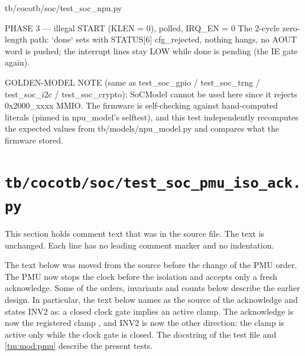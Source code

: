 \begin{relocated}{tb/cocotb/soc/test_soc_npu.py}
\begin{textblock}
PHASE 3 — illegal START (KLEN = 0), polled, IRQ_EN = 0
The 2-cycle zero-length path: `done` sets with STATUS[6] cfg_rejected, nothing hangs, no AOUT
word is pushed; the interrupt lines stay LOW while done is pending (the IE gate again).

GOLDEN-MODEL NOTE (same as test_soc_gpio / test_soc_trng / test_soc_i2c / test_soc_crypto): SoCModel
cannot be used here since it rejects 0x2000_xxxx MMIO. The firmware is self-checking against
hand-computed literals (pinned in npu_model's selftest), and this test independently recomputes the
expected values from tb/models/npu_model.py and compares what the firmware stored.
\end{textblock}

\end{relocated}

\section{\texttt{tb/cocotb/soc/test\_soc\_pmu\_iso\_ack.py}}\label{tm:suite:soc-test-soc-pmu-iso-ack}

This section holds comment text that was in the source file. The text is unchanged. Each line has no leading comment marker and no indentation.

\begin{information}
The text below was moved from the source before the change of the PMU order. The PMU now stops the clock before the isolation and accepts only a fresh acknowledge. Some of the orders, invariants and counts below describe the earlier design. In particular, the text below names  as the source of the acknowledge and states INV2 as: a closed clock gate implies an active clamp. The acknowledge is now the registered clamp , and INV2 is now the other direction: the clamp  is active only while the clock gate is closed. The docstring of the test file and \cref{tm:mod:pmu} describe the present tests.
\end{information}

